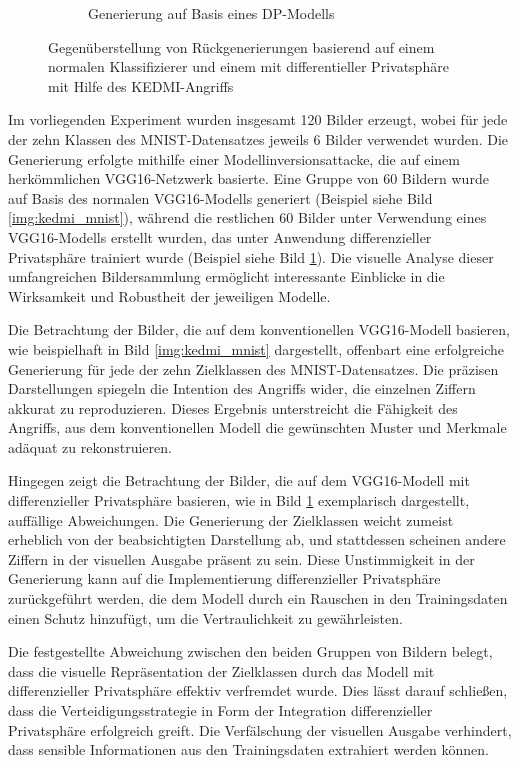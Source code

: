 \begin{figure}[H]
\begin{subfigure}[b]{0.35\linewidth}
		\caption{Generierung auf Basis eines DP-Modells}
		\label{img:kedmi_mnist_dp}
	\end{subfigure}
	\caption{Gegenüberstellung von Rückgenerierungen basierend auf einem normalen Klassifizierer und einem mit differentieller Privatsphäre mit Hilfe des \glqq KEDMI\grqq-Angriffs}
	\label{img:kedmi_dpvsnorm}
\end{figure}

Im vorliegenden Experiment wurden insgesamt 120 Bilder erzeugt, wobei für jede der zehn Klassen des MNIST-Datensatzes jeweils 6 Bilder verwendet wurden. Die Generierung erfolgte mithilfe einer Modellinversionsattacke, die auf einem herkömmlichen VGG16-Netzwerk basierte. Eine Gruppe von 60 Bildern wurde auf Basis des normalen VGG16-Modells generiert (Beispiel siehe Bild \ref{img:kedmi_mnist}), während die restlichen 60 Bilder unter Verwendung eines VGG16-Modells erstellt wurden, das unter Anwendung differenzieller Privatsphäre trainiert wurde (Beispiel siehe Bild \ref{img:kedmi_mnist_dp}). Die visuelle Analyse dieser umfangreichen Bildersammlung ermöglicht interessante Einblicke in die Wirksamkeit und Robustheit der jeweiligen Modelle.

Die Betrachtung der Bilder, die auf dem konventionellen VGG16-Modell basieren, wie beispielhaft in Bild \ref{img:kedmi_mnist} dargestellt, offenbart eine erfolgreiche Generierung für jede der zehn Zielklassen des MNIST-Datensatzes. Die präzisen Darstellungen spiegeln die Intention des Angriffs wider, die einzelnen Ziffern akkurat zu reproduzieren. Dieses Ergebnis unterstreicht die Fähigkeit des Angriffs, aus dem konventionellen Modell die gewünschten Muster und Merkmale adäquat zu rekonstruieren.

Hingegen zeigt die Betrachtung der Bilder, die auf dem VGG16-Modell mit differenzieller Privatsphäre basieren, wie in Bild \ref{img:kedmi_mnist_dp} exemplarisch dargestellt, auffällige Abweichungen. Die Generierung der Zielklassen weicht zumeist erheblich von der beabsichtigten Darstellung ab, und stattdessen scheinen andere Ziffern in der visuellen Ausgabe präsent zu sein. Diese Unstimmigkeit in der Generierung kann auf die Implementierung differenzieller Privatsphäre zurückgeführt werden, die dem Modell durch ein Rauschen in den Trainingsdaten einen Schutz hinzufügt, um die Vertraulichkeit zu gewährleisten.

Die festgestellte Abweichung zwischen den beiden Gruppen von Bildern belegt, dass die visuelle Repräsentation der Zielklassen durch das Modell mit differenzieller Privatsphäre effektiv verfremdet wurde. Dies lässt darauf schließen, dass die Verteidigungsstrategie in Form der Integration differenzieller Privatsphäre erfolgreich greift. Die Verfälschung der visuellen Ausgabe verhindert, dass sensible Informationen aus den Trainingsdaten extrahiert werden können.

